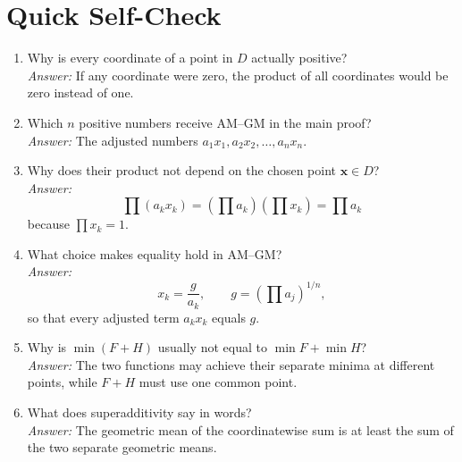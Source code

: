 \documentclass[11pt]{article}
\begin{document}
\section*{Quick Self-Check}

\begin{enumerate}
\item Why is every coordinate of a point in $D$ actually positive?\\
\emph{Answer:} If any coordinate were zero, the product of all coordinates
would be zero instead of one.

\item Which $n$ positive numbers receive AM--GM in the main proof?\\
\emph{Answer:} The adjusted numbers $a_1x_1,a_2x_2,\ldots,a_nx_n$.

\item Why does their product not depend on the chosen point $\mathbf x\in D$?\\
\emph{Answer:}
\[
 \prod(a_kx_k)=(\prod a_k)(\prod x_k)=\prod a_k
\]
because $\prod x_k=1$.

\item What choice makes equality hold in AM--GM?\\
\emph{Answer:}
\[
 x_k=\frac{g}{a_k},
 \qquad
 g=(\prod a_j)^{1/n},
\]
so that every adjusted term $a_kx_k$ equals $g$.

\item Why is $\min(F+H)$ usually not equal to $\min F+\min H$?\\
\emph{Answer:} The two functions may achieve their separate minima at different
points, while $F+H$ must use one common point.

\item What does superadditivity say in words?\\
\emph{Answer:} The geometric mean of the coordinatewise sum is at least the sum
of the two separate geometric means.
\end{enumerate}
\end{document}
